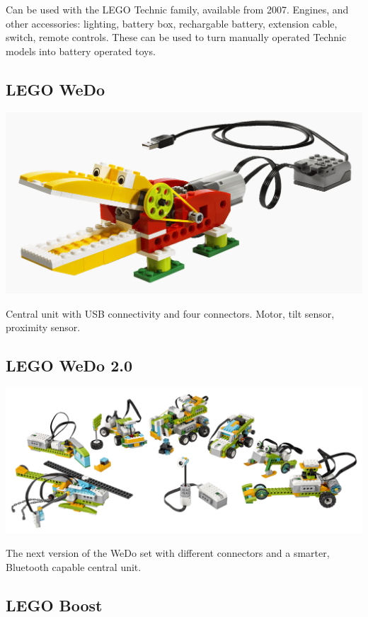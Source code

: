 \documentclass[a4paper,12pt]{article}
\begin{document}
Can be used with the LEGO Technic family, available from 2007. Engines, and
other accessories: lighting, battery box, rechargable battery, extension cable,
switch, remote controls. These can be used to turn manually operated Technic
models into battery operated toys.

\subsection{LEGO WeDo}

\includegraphics[width=13.5cm]{lego-wedo.jpg}

Central unit with USB connectivity and four connectors. Motor, tilt sensor,
proximity sensor.

\subsection{LEGO WeDo 2.0}

\includegraphics[width=13.5cm]{lego-wedo-2.jpg}

The next version of the WeDo set with different connectors and a smarter,
Bluetooth capable central unit.

\subsection{LEGO Boost}
\end{document}
